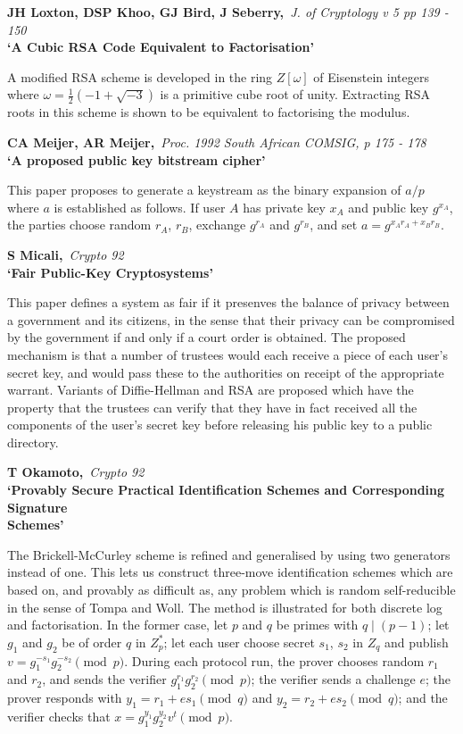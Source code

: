 {\bf \noindent JH Loxton, DSP Khoo, GJ Bird, J Seberry,}{\em ~J. of
Cryptology v 5 pp 139 - 150\\}
{\bf `A Cubic RSA Code Equivalent to Factorisation'}

A modified RSA scheme is developed in the ring $Z[\omega]$ of Eisenstein
integers where $\omega = \frac{1}{2}(-1+\sqrt{-3})$ is a primitive cube
root of unity. Extracting RSA roots in this scheme is shown to be equivalent 
to factorising the modulus.

{\bf \noindent CA Meijer, AR Meijer,}{\em ~Proc. 1992 South African COMSIG, 
p 175 - 178\\}
{\bf `A proposed public key bitstream cipher'}

This paper proposes to generate a keystream as the binary expansion of $a/p$ 
where $a$ is established as follows. If user $A$ has private key $x_A$ and 
public key $g^{x_A}$, the parties choose random $r_A$, $r_B$, exchange 
$g^{r_A}$ and $g^{r_B}$, and set $a = g^{x_Ar_A+x_Br_B}$.

\pagebreak

{\bf \noindent S Micali,}{\em ~Crypto 92\\}
{\bf `Fair Public-Key Cryptosystems'}

This paper defines a system as fair if it presenves the balance of
privacy between a government and its citizens, in the sense that 
their privacy can be compromised by the government if and
only if a court order is obtained. The proposed mechanism is that
a number of trustees would each receive a piece of each user's
secret key, and would pass these to the authorities on receipt of
the appropriate warrant. Variants of Diffie-Hellman and RSA are
proposed which have the property that the trustees can verify that
they have in fact received all the components of the user's secret 
key before releasing his public key to a public directory.

{\bf \noindent T Okamoto,}{\em ~Crypto 92\\}
{\bf `Provably Secure Practical Identification Schemes and Corresponding
Signature\\ Schemes'}

The Brickell-McCurley scheme is refined and generalised by using two generators
instead of one. This lets us construct three-move identification schemes which 
are based on, and provably as difficult as, any problem which is random 
self-reducible in the sense of Tompa and Woll. The method is illustrated for 
both discrete log and factorisation. In the former case, let $p$ and $q$ be
primes with $q \mid (p-1)$; let $g_1$ and $g_2$ be of order $q$ in $Z_p^*$;
let each user choose secret $s_1$, $s_2$ in $Z_q$ and publish $v = 
g_1^{-s_1}g_2^{-s_2} \pmod{p}$. During each protocol run, the prover chooses 
random $r_1$ and $r_2$, and sends the verifier $g_1^{r_1}g_2^{r_2} \pmod{p}$; 
the verifier sends a challenge $e$; the prover responds with 
$y_1 = r_1 + es_1 \pmod{q}$ and $y_2 = r_2 + es_2 \pmod{q}$; and the verifier 
checks that $x = g_1^{y_1}g_2^{y_2}v^t \pmod{p}$.

